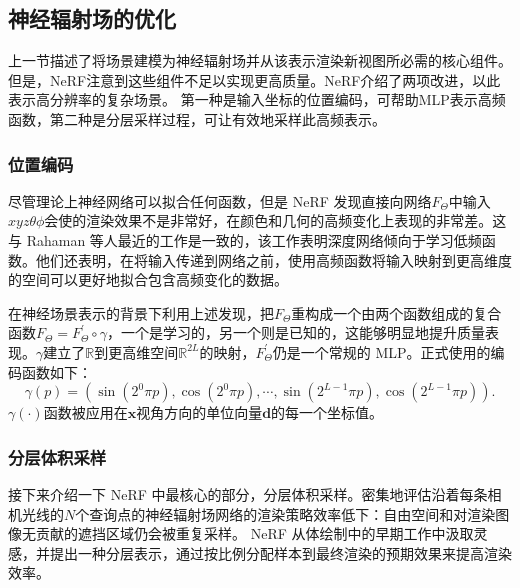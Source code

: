 \subsection{神经辐射场的优化}
上一节描述了将场景建模为神经辐射场并从该表示渲染新视图所必需的核心组件。 但是，NeRF注意到这些组件不足以实现更高质量。NeRF介绍了两项改进，以此表示高分辨率的复杂场景。 第一种是输入坐标的位置编码，可帮助MLP表示高频函数，第二种是分层采样过程，可让有效地采样此高频表示。

\subsubsection{位置编码}
尽管理论上神经网络可以拟合任何函数，但是 NeRF 发现直接向网络$\displaystyle F_{\Theta}$中输入$\displaystyle xyz\theta\phi$会使的渲染效果不是非常好，在颜色和几何的高频变化上表现的非常差。这与 Rahaman 等人\cite{rahaman2019spectral}最近的工作是一致的，该工作表明深度网络倾向于学习低频函数。他们还表明，在将输入传递到网络之前，使用高频函数将输入映射到更高维度的空间可以更好地拟合包含高频变化的数据。

在神经场景表示的背景下利用上述发现，把$\displaystyle F_{\Theta}$重构成一个由两个函数组成的复合函数$\displaystyle F_{\Theta} = F_{\Theta}^{\prime} \circ \gamma$，一个是学习的，另一个则是已知的，这能够明显地提升质量表现。$\displaystyle \gamma$建立了$\displaystyle \mathbb{R}$到更高维空间$\displaystyle \mathbb{R}^{2L}$的映射，$\displaystyle F_{\Theta}^{\prime}$仍是一个常规的 MLP。正式使用的编码函数如下：
\begin{equation}
    \gamma\left(p\right) = \left(\sin\left(2^{0}\pi p\right), \cos\left(2^{0}\pi p\right), \cdots, \sin\left(2^{L - 1}\pi p\right), \cos\left(2^{L - 1}\pi p\right)\right).
\end{equation}
$\displaystyle \gamma\left(\cdot\right)$函数被应用在$\displaystyle \symbf{x}$视角方向的单位向量$\displaystyle \symbf{d}$的每一个坐标值。

\subsubsection{分层体积采样}
接下来介绍一下 NeRF 中最核心的部分，分层体积采样。密集地评估沿着每条相机光线的$N$个查询点的神经辐射场网络的渲染策略效率低下：自由空间和对渲染图像无贡献的遮挡区域仍会被重复采样。 NeRF 从体绘制中的早期工作\cite{levoy1990efficient}中汲取灵感，并提出一种分层表示，通过按比例分配样本到最终渲染的预期效果来提高渲染效率。

